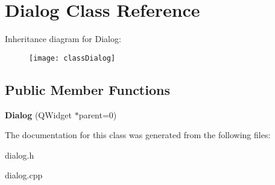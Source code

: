 \hypertarget{classDialog}{}\section{Dialog Class Reference}
\label{classDialog}
Inheritance diagram for Dialog\+:\begin{figure}[H]
\begin{center}
\leavevmode
\texttt{[image: classDialog]}
\end{center}
\end{figure}
\subsection*{Public Member Functions}
\begin{DoxyCompactItemize}
\item 
{\bfseries Dialog} (Q\+Widget $\ast$parent=0)\hypertarget{classDialog_acfa2063f9f962d394c6a645b6e7e08d8}{}\label{classDialog_acfa2063f9f962d394c6a645b6e7e08d8}

\end{DoxyCompactItemize}


The documentation for this class was generated from the following files\+:\begin{DoxyCompactItemize}
\item 
dialog.\+h\item 
dialog.\+cpp\end{DoxyCompactItemize}

